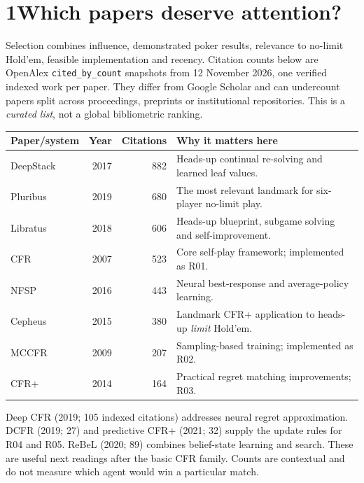 \documentclass[10pt,letterpaper]{article}
\begin{document}
\newpage
\section*{1\quad Which papers deserve attention?}
Selection combines influence, demonstrated poker results, relevance to
no-limit Hold'em, feasible implementation and recency. Citation counts below
are OpenAlex \texttt{cited\_by\_count} snapshots from 12 November 2026, one
verified indexed work per paper. They differ from Google Scholar and can
undercount papers split across proceedings, preprints or institutional
repositories. This is a \emph{curated list}, not a global bibliometric ranking.

\begin{center}\small
\begin{tabularx}{\linewidth}{lrrX}
\toprule
Paper/system & Year & Citations & Why it matters here \\
\midrule
DeepStack \cite{deepstack} & 2017 & 882 & Heads-up continual re-solving and learned leaf values. \\
Pluribus \cite{pluribus} & 2019 & 680 & The most relevant landmark for six-player no-limit play. \\
Libratus \cite{libratus} & 2018 & 606 & Heads-up blueprint, subgame solving and self-improvement. \\
CFR \cite{cfr} & 2007 & 523 & Core self-play framework; implemented as R01. \\
NFSP \cite{nfsp} & 2016 & 443 & Neural best-response and average-policy learning. \\
Cepheus \cite{cepheus} & 2015 & 380 & Landmark CFR+ application to heads-up \emph{limit} Hold'em. \\
MCCFR \cite{mccfr} & 2009 & 207 & Sampling-based training; implemented as R02. \\
CFR+ \cite{cfr_plus} & 2014 & 164 & Practical regret matching improvements; R03. \\
\bottomrule
\end{tabularx}
\end{center}

Deep CFR \cite{deep_cfr} (2019; 105 indexed citations) addresses neural
regret approximation. DCFR \cite{dcfr} (2019; 27) and predictive CFR+
\cite{pcfr_plus} (2021; 32) supply the update rules for R04 and R05. ReBeL
\cite{rebel} (2020; 89) combines belief-state learning and search. These are
useful next readings after the basic CFR family. Counts are contextual and do
not measure which agent would win a particular match.
\end{document}
